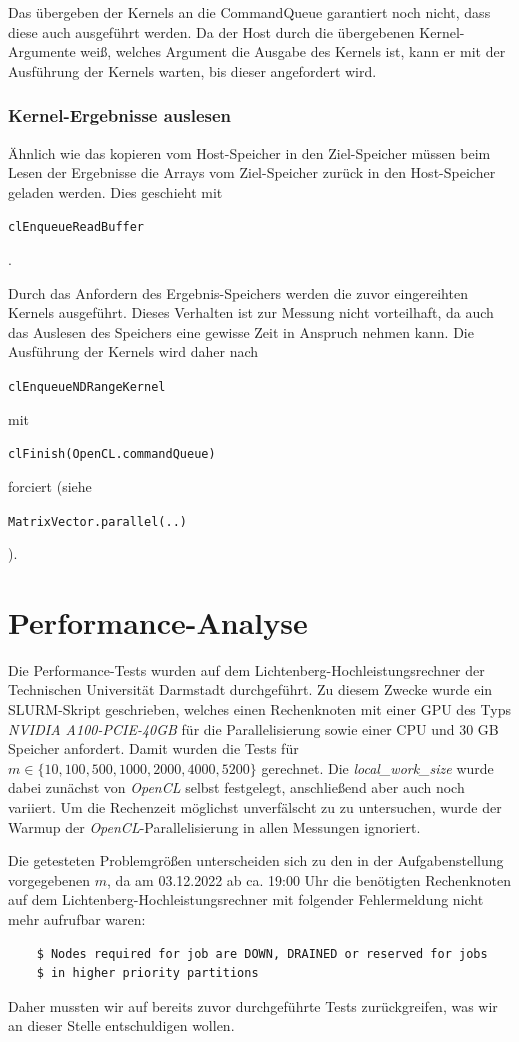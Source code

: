 \documentclass[
	ngerman,
	ruledheaders=section,
	class=report,
	thesis={type=Dokumentation},
	ignore-missing-data=true,
	accentcolor=9c,
	custommargins=false,
	marginpar=false,
	parskip=half-,
	fontsize=11pt,
]{tudapub}
\let\code\texttt
\def\code#1{\begin{small}\texttt{#1}\end{small}}
\begin{document}
Das übergeben der Kernels an die CommandQueue garantiert noch nicht, dass diese auch ausgeführt werden. Da der Host durch die übergebenen Kernel-Argumente weiß, welches Argument die Ausgabe des Kernels ist, kann er mit der Ausführung der Kernels warten, bis dieser angefordert wird.

\subsection{Kernel-Ergebnisse auslesen}
Ähnlich wie das kopieren vom Host-Speicher in den Ziel-Speicher müssen beim Lesen der Ergebnisse die Arrays vom Ziel-Speicher zurück in den Host-Speicher geladen werden. Dies geschieht mit \code{clEnqueueReadBuffer}.

Durch das Anfordern des Ergebnis-Speichers werden die zuvor eingereihten Kernels ausgeführt. Dieses Verhalten ist zur Messung nicht vorteilhaft, da auch das Auslesen des Speichers eine gewisse Zeit in Anspruch nehmen kann. Die Ausführung der Kernels wird daher nach \code{clEnqueueNDRangeKernel} mit \code{clFinish(OpenCL.commandQueue)} forciert (siehe \code{MatrixVector.parallel(..)}).

\chapter{Performance-Analyse}
Die Performance-Tests wurden auf dem Lichtenberg-Hochleistungsrechner der Technischen Universität Darmstadt durchgeführt. Zu diesem Zwecke wurde ein SLURM-Skript geschrieben, welches einen Rechenknoten mit einer GPU des Typs \textit{NVIDIA A100-PCIE-40GB} für die Parallelisierung sowie einer CPU und 30 GB Speicher anfordert. Damit wurden die Tests für $m \in \{10, 100, 500, 1000, 2000, 4000, 5200\}$ gerechnet. Die \textit{local\_work\_size} wurde dabei zunächst von \textit{OpenCL} selbst festgelegt, anschließend aber auch noch variiert. Um die Rechenzeit möglichst unverfälscht zu zu untersuchen, wurde der Warmup der \textit{OpenCL}-Parallelisierung in allen Messungen ignoriert.

Die getesteten Problemgrößen unterscheiden sich zu den in der Aufgabenstellung vorgegebenen $m$, da am 03.12.2022 ab ca. 19:00 Uhr die benötigten Rechenknoten auf dem Lichtenberg-Hochleistungsrechner mit folgender Fehlermeldung nicht mehr aufrufbar waren:
\begin{lstlisting}
	$ Nodes required for job are DOWN, DRAINED or reserved for jobs 
	$ in higher priority partitions
\end{lstlisting}
Daher mussten wir auf bereits zuvor durchgeführte Tests zurückgreifen, was wir an dieser Stelle entschuldigen wollen.
\end{document}
